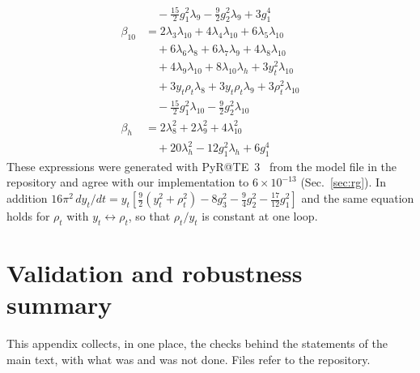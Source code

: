 \documentclass[twocolumn,epjc3]{svjour3}
\begin{document}
\begin{align}
&\quad -\tfrac{15}{2}g_1^2\lambda_9 -\tfrac{9}{2}g_2^2\lambda_9 +3g_1^4\\
\beta_{10}&=2\lambda_3\lambda_{10} +4\lambda_4\lambda_{10} +6\lambda_5\lambda_{10}\nonumber\\
&\quad +6\lambda_6\lambda_8 +6\lambda_7\lambda_9 +4\lambda_8\lambda_{10}\nonumber\\
&\quad +4\lambda_9\lambda_{10} +8\lambda_{10}\lambda_h +3y_t^2\lambda_{10}\nonumber\\
&\quad +3y_t\rho_t\lambda_8 +3y_t\rho_t\lambda_9 +3\rho_t^2\lambda_{10}\nonumber\\
&\quad -\tfrac{15}{2}g_1^2\lambda_{10} -\tfrac{9}{2}g_2^2\lambda_{10}\\
\beta_{h}&=2\lambda_8^2 +2\lambda_9^2 +4\lambda_{10}^2\nonumber\\
&\quad +20\lambda_h^2 -12g_1^2\lambda_h +6g_1^4
\end{align}
These expressions were generated with PyR@TE~3~\cite{Sartore:2020gou} from the model file in the repository and agree with our implementation to $6\times10^{-13}$ (Sec.~\ref{sec:rg}). In addition $16\pi^2\,dy_t/dt=y_t[\tfrac92(y_t^2+\rho_t^2)-8g_3^2-\tfrac94g_2^2-\tfrac{17}{12}g_1^2]$ and the same equation holds for $\rho_t$ with $y_t\leftrightarrow\rho_t$, so that $\rho_t/y_t$ is constant at one loop.

\section{Validation and robustness summary}\label{app:val}
This appendix collects, in one place, the checks behind the statements of the main text, with what was and was not done. Files refer to the repository.
\end{document}
